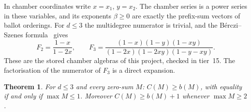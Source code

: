 \documentclass[11pt,a4paper]{article}
\theoremstyle{plain}
\newtheorem{theorem}{Theorem}
\theoremstyle{definition}
\theoremstyle{remark}
\begin{document}
In chamber coordinates write $x = x_1$, $y = x_2$. The chamber series is a power series in these
variables, and its exponents $\beta \ge 0$ are exactly the prefix-sum vectors of ballot orderings.
For $d \le 3$ the multidegree numerator is trivial, and the B\'erczi--Szenes formula~\cite{BS12}
gives
\[
  F_2 = \frac{1 - x}{1 - 2x}, \qquad
  F_3 = \frac{(1-x)(1-y)(1-xy)}{(1-2x)(1-2xy)(1-y-xy)} .
\]
These are the stored chamber algebras of this project, checked in tier~15. The factorisation of
the numerator of $F_3$ is a direct expansion.

\begin{theorem}\label{thm:small}
For $d \le 3$ and every zero-sum $M$: $C(M) \ge b(M)$, with equality if and only if
$\max M \le 1$. Moreover $C(M) \ge b(M) + 1$ whenever $\max M \ge 2$.
\end{theorem}
\end{document}
